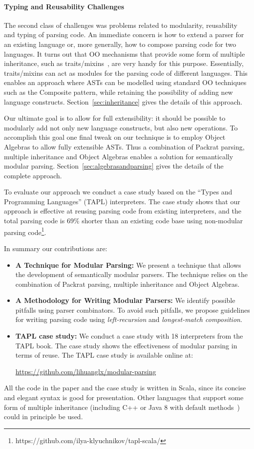 \paragraph{Typing and Reusability Challenges} The second class of
challenges was problems related to modularity, reusability and
typing of parsing code. An immediate concern is how to extend a
parser for an existing language or, more generally, how to compose
parsing code for two languages. It turns out that OO mechanisms that
provide some form of multiple inheritance,
such as traits/mixins~\cite{Bracha1990,Scharli2003}, are very handy for this
purpose. Essentially, traits/mixins can act as modules for the parsing code
of different languages. This enables an approach where ASTs can be
modelled using standard OO techniques such as the {\sc Composite}
pattern, while retaining the possibility of adding new language
constructs. Section~\ref{sec:inheritance} gives the details of this approach.

Our ultimate goal is to allow for full extensibility: it should be
possible to modularly add not only new language constructs, but
also new operations. To accomplish this goal one final tweak on our
technique is to employ Object Algebras to allow fully extensible
ASTs. Thus a combination of Packrat parsing, multiple inheritance
and Object Algebras enables a solution for semantically modular
parsing. Section~\ref{sec:algebrasandparsing} gives the details of the complete approach.

To evaluate our approach we conduct a case study based on the ``Types
and Programming Languages'' (TAPL) interpreters. The case study shows
that our approach is effective at reusing parsing code from existing
interpreters, and the total parsing code is 69\% shorter than an
existing code base using non-modular parsing code\footnote{https://github.com/ilya-klyuchnikov/tapl-scala/}.

In summary our contributions are:

\begin{itemize}[leftmargin=*]

\item \textbf{A Technique for Modular Parsing:}
  We present a technique that allows the development of semantically modular parsers.
  The technique relies on the combination of Packrat parsing, multiple inheritance
  and Object Algebras.

\item \textbf{A Methodology for Writing Modular Parsers:} We
  identify possible pitfalls using parser combinators. To avoid such
  pitfalls, we propose guidelines for writing parsing code using
  \emph{left-recursion} and \emph{longest-match composition}.

\item \textbf{TAPL case study:} We conduct a case study with 18 interpreters
  from the TAPL book. The case study shows the effectiveness of modular
  parsing in terms of reuse. The TAPL case study is available online
  at:

  \url{https://github.com/lihuanglx/modular-parsing}

\end{itemize}

All the code in the paper and the case study is written in Scala, since its concise and elegant
syntax is good for presentation. Other languages that support some form of multiple inheritance
(including C++ or Java 8 with default methods~\cite{Goetz2012}) could in principle be
used.
